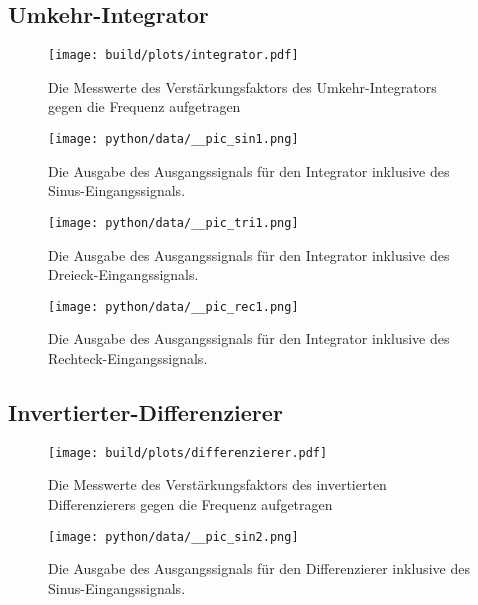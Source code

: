 \subsection{Umkehr-Integrator}



\begin{figure}[H]
  \centering
  \texttt{[image: build/plots/integrator.pdf]}
  \caption{Die Messwerte des Verstärkungsfaktors des Umkehr-Integrators gegen die Frequenz aufgetragen}
\label{fig:int1}
\end{figure}


\begin{figure}[H]
  \centering
  \texttt{[image: python/data/\_\_pic\_sin1.png]}
  \caption{Die Ausgabe des Ausgangssignals für den Integrator inklusive des Sinus-Eingangssignals. }
\label{fig:int_sin}
\end{figure}


\begin{figure}[H]
  \centering
  \texttt{[image: python/data/\_\_pic\_tri1.png]}
  \caption{Die Ausgabe des Ausgangssignals für den Integrator inklusive des Dreieck-Eingangssignals. }
\label{fig:int_dre}
\end{figure}


\begin{figure}[H]
  \centering
  \texttt{[image: python/data/\_\_pic\_rec1.png]}
  \caption{Die Ausgabe des Ausgangssignals für den Integrator inklusive des Rechteck-Eingangssignals. }
\label{fig:int_recht}
\end{figure}


\subsection{Invertierter-Differenzierer}



\begin{figure}[H]
  \centering
  \texttt{[image: build/plots/differenzierer.pdf]}
  \caption{Die Messwerte des Verstärkungsfaktors des invertierten Differenzierers gegen die Frequenz aufgetragen}
\label{fig:diff1}
\end{figure}


\begin{figure}[H]
  \centering
  \texttt{[image: python/data/\_\_pic\_sin2.png]}
  \caption{Die Ausgabe des Ausgangssignals für den Differenzierer inklusive des Sinus-Eingangssignals. }
\label{fig:diff_sin}
\end{figure}


